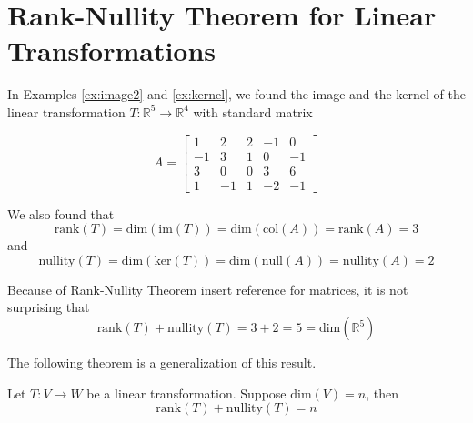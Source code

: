 \documentclass{ximera}
\newcommand{\RR}{\mathbb{R}}
\begin{document}
\section*{Rank-Nullity Theorem for Linear Transformations}

In Examples \ref{ex:image2} and \ref{ex:kernel}, we found the image and the kernel of the linear transformation $T:\RR^5\rightarrow \RR^4$ with standard matrix

$$A=\begin{bmatrix}1 & 2 & 2 &-1 & 0\\-1 & 3 & 1 & 0 & -1\\3 & 0 & 0 & 3 & 6\\ 1 & -1 & 1 & -2 & -1\end{bmatrix}$$

We also found that
$$\text{rank}(T)=\text{dim}(\text{im}(T))=\text{dim}(\text{col}(A))=\text{rank}(A)=3$$
and
$$\text{nullity}(T)=\text{dim}(\text{ker}(T))=\text{dim}(\text{null}(A))=\text{nullity}(A)=2$$

Because of Rank-Nullity Theorem {\color{red} insert reference} for matrices, it is not surprising that 
$$\text{rank}(T)+\text{nullity}(T)=3+2=5=\text{dim}(\RR^5)$$


The following theorem is a generalization of this result.

\begin{theorem}
Let $T:V\rightarrow W$ be a linear transformation.  Suppose $\text{dim}(V)=n$, then
$$\text{rank}(T)+\text{nullity}(T)=n$$
\end{theorem}
\end{document}
